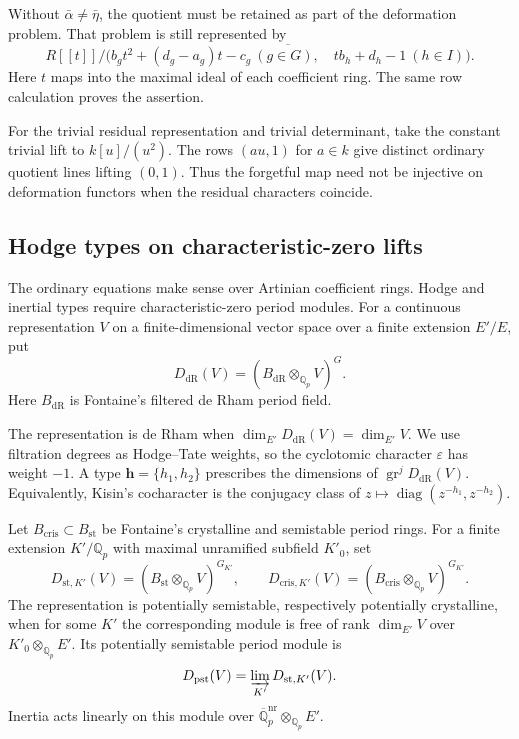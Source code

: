 \begin{remark}
Without $\bar\alpha\ne\bar\eta$, the quotient must be retained
as part of the deformation problem. That problem is still represented
by
\[
 R[[t]]\big/
 \overline{\bigl(
 b_gt^2+(d_g-a_g)t-c_g\ (g\in G),\quad
 tb_h+d_h-1\ (h\in I)
 \bigr)}.
\]
Here $t$ maps into the maximal ideal of each coefficient ring.
The same row calculation proves the assertion.

For the trivial residual representation and trivial determinant,
take the constant trivial lift to $k[u]/(u^2)$.
The rows $(a u,1)$ for $a\in k$ give distinct ordinary quotient
lines lifting $(0,1)$. Thus the forgetful map need not be injective
on deformation functors when the residual characters coincide.
\end{remark}

\subsection{Hodge types on characteristic-zero lifts}

The ordinary equations make sense over Artinian coefficient rings.
Hodge and inertial types require characteristic-zero period modules.
For a continuous representation $V$ on a finite-dimensional vector
space over a finite extension $E'/E$, put
\[
 D_{\mathrm{dR}}(V)
   =(B_{\mathrm{dR}}\otimes_{\mathbb Q_p}V)^G.
\]
Here $B_{\mathrm{dR}}$ is Fontaine's filtered de Rham period field.

The representation is de Rham when
$\dim_{E'}D_{\mathrm{dR}}(V)=\dim_{E'}V$.
We use filtration degrees as Hodge--Tate weights, so the cyclotomic
character $\varepsilon$ has weight $-1$.
A type $\mathbf h=\{h_1,h_2\}$ prescribes the dimensions of
$\operatorname{gr}^jD_{\mathrm{dR}}(V)$.
Equivalently, Kisin's cocharacter is the conjugacy class of
$z\mapsto\operatorname{diag}(z^{-h_1},z^{-h_2})$.

Let $B_{\mathrm{cris}}\subset B_{\mathrm{st}}$ be Fontaine's
crystalline and semistable period rings. For a finite extension
$K'/\mathbb Q_p$ with maximal unramified subfield $K'_0$, set
\[
 D_{\mathrm{st},K'}(V)=(B_{\mathrm{st}}\otimes_{\mathbb Q_p}V)^{G_{K'}},
 \qquad
 D_{\mathrm{cris},K'}(V)=(B_{\mathrm{cris}}\otimes_{\mathbb Q_p}V)^{G_{K'}}.
\]
The representation is potentially semistable, respectively potentially
crystalline, when for some $K'$ the corresponding module is free of
rank $\dim_{E'}V$ over $K'_0\otimes_{\mathbb Q_p}E'$.
Its potentially semistable period module is
\[
 D_{\mathrm{pst}}(V)=\varinjlim_{K'}D_{\mathrm{st},K'}(V).
\]
Inertia acts linearly on this module over
$\overline{\mathbb Q}_p^{\mathrm{nr}}\otimes_{\mathbb Q_p}E'$.

